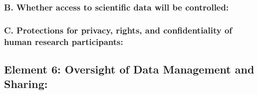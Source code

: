 \documentclass[../main.tex]{subfiles}
\begin{document}
\subsubsection*{B. Whether access to scientific data will be controlled:}
\lipsum[1-3]

\subsubsection*{C. Protections for privacy, rights, and confidentiality of human research participants:}
\lipsum[1-3]

\subsection*{Element 6: Oversight of Data Management and Sharing:}

\lipsum[1-3]
\end{document}
